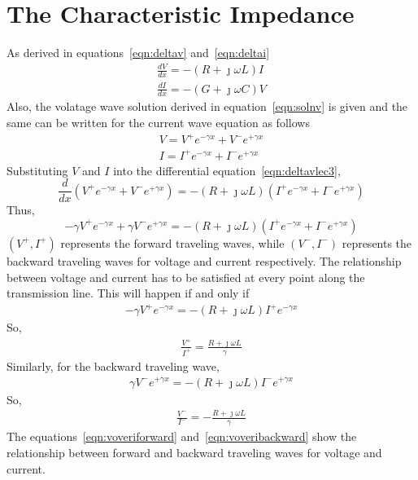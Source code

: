 \section{The Characteristic Impedance}
As derived in equations~\eqref{eqn:deltav} and~\eqref{eqn:deltai}
\begin{align}
\frac{dV}{dx} = -(R+\jmath\omega L)I\label{eqn:deltavlec3}\\
\frac{dI}{dx} = -(G+\jmath\omega C)V\label{en:deltavlec3}
\end{align}
Also, the volatage wave solution derived in equation~\eqref{eqn:solnv} is given and the same can be written for the current wave equation as follows
\begin{align*}
V = V^+e^{-\gamma x}+V^-e^{+\gamma x}\\
I = I^+e^{-\gamma x}+I^-e^{+\gamma x}
\end{align*}
Substituting $V$ and $I$ into the differential equation~\eqref{eqn:deltavlec3},
\[
\frac{d}{dx}(V^+e^{-\gamma x}+V^-e^{+\gamma x}) = -(R+\jmath\omega L)(I^+e^{-\gamma x}+I^-e^{+\gamma x})
\]
Thus,
\[
-\gamma V^+e^{-\gamma x}+\gamma V^-e^{+\gamma x} = -(R+\jmath\omega L)(I^+e^{-\gamma x}+I^-e^{+\gamma x})
\]
$(V^+,I^+)$ represents the forward traveling waves, while $(V^-,I^-)$ represents the backward traveling waves for voltage and current respectively. The relationship between voltage and current has to be satisfied at every point along the transmission line. This will happen if and only if
\begin{align*}
-\gamma V^+e^{-\gamma x} = -(R+\jmath\omega L)I^+e^{-\gamma x}
\end{align*}
So,
\begin{align}
\frac{V^+}{I^+} = \frac{R+\jmath\omega L}{\gamma}
\label{eqn:voveriforward}
\end{align}
Similarly, for the backward traveling wave, 
\begin{align*}
\gamma V^-e^{+\gamma x} = -(R+\jmath\omega L)I^-e^{+\gamma x}
\end{align*}
So,
\begin{align}
\frac{V^-}{I^-} = -\frac{R+\jmath\omega L}{\gamma}
\label{eqn:voveribackward}
\end{align}
The equations~\eqref{eqn:voveriforward} and~\eqref{eqn:voveribackward} show the relationship between forward and backward traveling waves for voltage and current.

